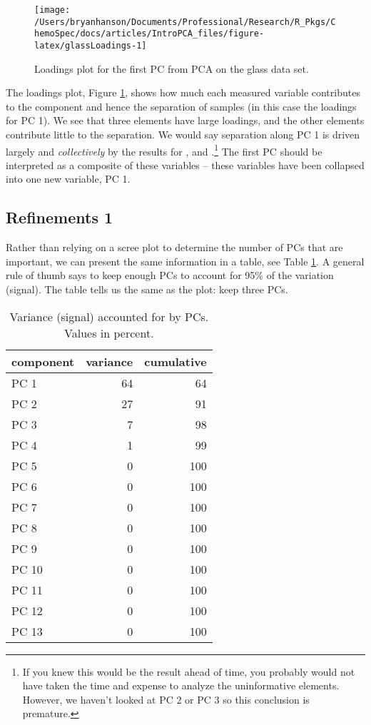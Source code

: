 \documentclass[10pt,twocolumn,twoside,]{pinp}
\begin{document}
\begin{figure}

{\centering \texttt{[image: /Users/bryanhanson/Documents/Professional/Research/R\_Pkgs/ChemoSpec/docs/articles/IntroPCA\_files/figure-latex/glassLoadings-1]} 

}

\caption{Loadings plot for the first PC from PCA on the glass data set.\label{fig:glassLoadings}}\label{fig:glassLoadings}
\end{figure}

The loadings plot, Figure \ref{fig:glassLoadings}, shows how much each
measured variable contributes to the component and hence the separation
of samples (in this case the loadings for PC 1). We see that three
elements have large loadings, and the other elements contribute little
to the separation. We would say separation along PC 1 is driven largely
and \emph{collectively} by the results for ,  and
.\footnote{If you knew this would be the result ahead of time, you probably would not have taken the time and expense to analyze the uninformative elements.  However, we haven't looked at PC 2 or PC 3 so this conclusion is premature.}
The first PC should be interpreted as a composite of these variables --
these variables have been collapsed into one new variable, PC 1.

\hypertarget{refinements-1}{%
\subsection{Refinements 1}\label{refinements-1}}

Rather than relying on a scree plot to determine the number of PCs that
are important, we can present the same information in a table, see Table
\ref{tab:screeTable}. A general rule of thumb says to keep enough PCs to
account for 95\% of the variation (signal). The table tells us the same
as the plot: keep three PCs.

\begin{table}

\caption{\label{tab:screeTable}Variance (signal) accounted for by PCs. Values in percent.\label{tab:screeTable}}
\centering
\begin{tabular}[t]{l|r|r}
\hline
component & variance & cumulative\\
\hline
PC 1 & 64 & 64\\
\hline
PC 2 & 27 & 91\\
\hline
PC 3 & 7 & 98\\
\hline
PC 4 & 1 & 99\\
\hline
PC 5 & 0 & 100\\
\hline
PC 6 & 0 & 100\\
\hline
PC 7 & 0 & 100\\
\hline
PC 8 & 0 & 100\\
\hline
PC 9 & 0 & 100\\
\hline
PC 10 & 0 & 100\\
\hline
PC 11 & 0 & 100\\
\hline
PC 12 & 0 & 100\\
\hline
PC 13 & 0 & 100\\
\hline
\end{tabular}
\end{table}
\end{document}
